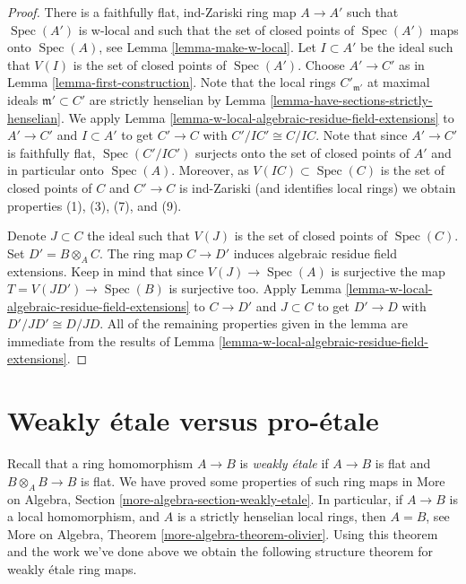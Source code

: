 \documentclass{stacks-project}
\theoremstyle{plain}
\theoremstyle{definition}
\theoremstyle{remark}
\numberwithin{equation}{subsection}
\def\Spec{\mathop{\mathrm{Spec}}}
\begin{document}
\begin{proof}
There is a faithfully flat, ind-Zariski ring map $A \to A'$ such that
$\Spec(A')$ is w-local and such that the set of closed points of
$\Spec(A')$ maps onto $\Spec(A)$, see Lemma \ref{lemma-make-w-local}.
Let $I \subset A'$ be the ideal such that $V(I)$ is the set
of closed points of $\Spec(A')$.
Choose $A' \to C'$ as in Lemma \ref{lemma-first-construction}.
Note that the local rings $C'_{\mathfrak m'}$ at maximal ideals
$\mathfrak m' \subset C'$ are strictly henselian by
Lemma \ref{lemma-have-sections-strictly-henselian}.
We apply Lemma \ref{lemma-w-local-algebraic-residue-field-extensions}
to $A' \to C'$ and $I \subset A'$ to get $C' \to C$ with $C'/IC' \cong C/IC$.
Note that since $A' \to C'$ is faithfully flat, $\Spec(C'/IC')$
surjects onto the set of closed points of $A'$ and in particular
onto $\Spec(A)$. Moreover, as $V(IC) \subset \Spec(C)$
is the set of closed points of $C$ and $C' \to C$ is ind-Zariski
(and identifies local rings) we obtain properties (1), (3), (7), and (9).

\medskip\noindent
Denote $J \subset C$ the ideal such that $V(J)$ is the set of closed
points of $\Spec(C)$. Set $D' = B \otimes_A C$. The ring
map $C \to D'$ induces algebraic residue field extensions. Keep in mind that
since $V(J) \to \Spec(A)$ is surjective the map $T = V(JD') \to \Spec(B)$
is surjective too. Apply
Lemma \ref{lemma-w-local-algebraic-residue-field-extensions}
to $C \to D'$ and $J \subset C$ to get 
$D' \to D$ with $D'/JD' \cong D/JD$.
All of the remaining properties given in the lemma are
immediate from the results of
Lemma \ref{lemma-w-local-algebraic-residue-field-extensions}.
\end{proof}








\section{Weakly \'etale versus pro-\'etale}
\label{section-weakly-etale}

\noindent
Recall that a ring homomorphism $A \to B$ is {\it weakly \'etale}
if $A \to B$ is flat and $B \otimes_A B \to B$ is flat. We have
proved some properties of such ring maps in
More on Algebra, Section \ref{more-algebra-section-weakly-etale}.
In particular, if $A \to B$ is a local homomorphism, and $A$ is a
strictly henselian local rings, then $A = B$, see
More on Algebra, Theorem \ref{more-algebra-theorem-olivier}.
Using this theorem and the work we've done above we obtain
the following structure theorem for weakly \'etale ring maps.
\end{document}
